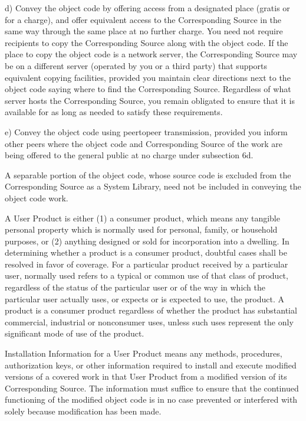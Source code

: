 \documentclass[letterpaper,10pt,english]{sphinxmanual}
\begin{document}
\begin{sphinxVerbatim}[commandchars=\\\{\}]
    d) Convey the object code by offering access from a designated
    place (gratis or for a charge), and offer equivalent access to the
    Corresponding Source in the same way through the same place at no
    further charge.  You need not require recipients to copy the
    Corresponding Source along with the object code.  If the place to
    copy the object code is a network server, the Corresponding Source
    may be on a different server (operated by you or a third party)
    that supports equivalent copying facilities, provided you maintain
    clear directions next to the object code saying where to find the
    Corresponding Source.  Regardless of what server hosts the
    Corresponding Source, you remain obligated to ensure that it is
    available for as long as needed to satisfy these requirements.

    e) Convey the object code using peer\PYGZhy{}to\PYGZhy{}peer transmission, provided
    you inform other peers where the object code and Corresponding
    Source of the work are being offered to the general public at no
    charge under subsection 6d.

  A separable portion of the object code, whose source code is excluded
from the Corresponding Source as a System Library, need not be
included in conveying the object code work.

  A \PYGZdq{}User Product\PYGZdq{} is either (1) a \PYGZdq{}consumer product\PYGZdq{}, which means any
tangible personal property which is normally used for personal, family,
or household purposes, or (2) anything designed or sold for incorporation
into a dwelling.  In determining whether a product is a consumer product,
doubtful cases shall be resolved in favor of coverage.  For a particular
product received by a particular user, \PYGZdq{}normally used\PYGZdq{} refers to a
typical or common use of that class of product, regardless of the status
of the particular user or of the way in which the particular user
actually uses, or expects or is expected to use, the product.  A product
is a consumer product regardless of whether the product has substantial
commercial, industrial or non\PYGZhy{}consumer uses, unless such uses represent
the only significant mode of use of the product.

  \PYGZdq{}Installation Information\PYGZdq{} for a User Product means any methods,
procedures, authorization keys, or other information required to install
and execute modified versions of a covered work in that User Product from
a modified version of its Corresponding Source.  The information must
suffice to ensure that the continued functioning of the modified object
code is in no case prevented or interfered with solely because
modification has been made.


\end{sphinxVerbatim}
\end{document}
